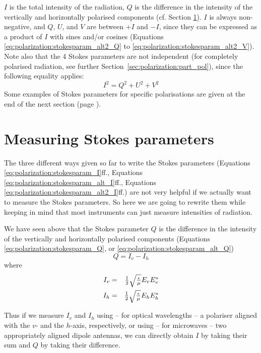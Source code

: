 $I$ is the total intensity of the radiation, $Q$ is the difference in the
intensity of the vertically and horizontally polarised components (cf. Section
\ref{sec:polarization:measuring}). $I$ is always non-negative, and $Q$, $U$,
and $V$ are between $+I$ and $-I$, since they can be expressed as a product of
$I$ with sines and/or cosines (Equations
\ref{eq:polarization:stokesparam_alt2_Q} to
\ref{eq:polarization:stokesparam_alt2_V}). Note also that the 4 Stokes
parameters are not independent (for completely polarised radiation, see further
Section~\ref{sec:polarization:part_pol}), since the following equality applies:
\begin{equation}
  \label{eq:polarization:Isquare}
  I^2 = Q^2 + U^2 + V^2
\end{equation}
Some examples of Stokes parameters for specific polarisations are given
at the end of the next section (page \pageref{stokes-examples}).


\section{Measuring Stokes parameters}
\label{sec:polarization:measuring}
The three different ways given so far to write the Stokes parameters
(Equations \ref{eq:polarization:stokesparam_I}ff.,
Equations \ref{eq:polarization:stokesparam_alt_I}ff.,
Equations \ref{eq:polarization:stokesparam_alt2_I}ff.)  are not very
helpful if we actually want to measure the Stokes parameters. So here
we are going to rewrite them while keeping in mind that most
instruments can just measure intensities of radiation.

We have seen above that the Stokes parameter $Q$ is the difference in
the intensity of the vertically and horizontally polarised components 
(Equations \ref{eq:polarization:stokesparam_Q},
or \ref{eq:polarization:stokesparam_alt_Q})
\begin{equation}
  \label{eq:polarization:Q_Idiff}
  Q = I_v - I_h
\end{equation}
where
\begin{eqnarray}
  \label{eq:polarization:Iv}
  I_v &=&  \textstyle\frac{1}{2}\sqrt{\textstyle{\frac{\epsilon}{\mu}}} E_v E_v^\ast\\
  \label{eq:polarization:Ih}
  I_h &=&  \textstyle\frac{1}{2}\sqrt{\textstyle{\frac{\epsilon}{\mu}}} E_h E_h^\ast
\end{eqnarray}
  
Thus if we measure $I_v$ and $I_h$ using -- for optical wavelengths --
a polariser aligned with the $v$- and the $h$-axis, respectively, or
using -- for microwaves -- two appropriately aligned dipole antennas, we
can directly obtain $I$ by taking their sum and $Q$ by taking their
difference.


